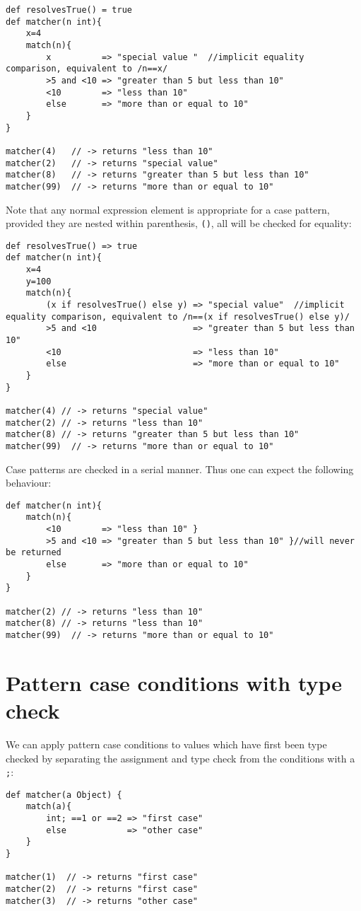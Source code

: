 \documentclass[conc-doc]{subfiles}
\begin{document}
\begin{lstlisting}
def resolvesTrue() = true
def matcher(n int){
	x=4
	match(n){
		x          => "special value "  //implicit equality comparison, equivalent to /n==x/
		>5 and <10 => "greater than 5 but less than 10" 
		<10        => "less than 10" 
		else       => "more than or equal to 10" 
	}
}

matcher(4)   // -> returns "less than 10"
matcher(2)   // -> returns "special value"
matcher(8)   // -> returns "greater than 5 but less than 10"
matcher(99)  // -> returns "more than or equal to 10"
\end{lstlisting}

Note that any normal expression element is appropriate for a case pattern, provided they are nested within parenthesis, \lstinline{()}, all will be checked for equality:

\begin{lstlisting}
def resolvesTrue() => true
def matcher(n int){
	x=4
	y=100
	match(n){
		(x if resolvesTrue() else y) => "special value"  //implicit equality comparison, equivalent to /n==(x if resolvesTrue() else y)/
		>5 and <10                   => "greater than 5 but less than 10" 
		<10                          => "less than 10" 
		else                         => "more than or equal to 10" 
	}
}

matcher(4) // -> returns "special value"
matcher(2) // -> returns "less than 10"
matcher(8) // -> returns "greater than 5 but less than 10"
matcher(99)  // -> returns "more than or equal to 10"
\end{lstlisting}

Case patterns are checked in a serial manner. Thus one can expect the following behaviour:

\begin{lstlisting}
def matcher(n int){
	match(n){
		<10        => "less than 10" }
		>5 and <10 => "greater than 5 but less than 10" }//will never be returned
		else       => "more than or equal to 10"
	}
}

matcher(2) // -> returns "less than 10"
matcher(8) // -> returns "less than 10"
matcher(99)  // -> returns "more than or equal to 10"
\end{lstlisting}

\section{Pattern case conditions with type check}
We can apply pattern case conditions to values which have first been type checked by separating the assignment and type check from the conditions with a \lstinline{;}:
\begin{lstlisting}
def matcher(a Object) {
	match(a){
		int; ==1 or ==2 => "first case"
		else            => "other case"
	}
}

matcher(1)  // -> returns "first case"
matcher(2)  // -> returns "first case"
matcher(3)  // -> returns "other case"
\end{lstlisting}
\end{document}
